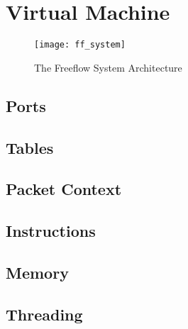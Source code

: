 \chapter{Virtual Machine}
\label{vm}

\begin{figure}[h]
\centering
\texttt{[image: ff\_system]}
\caption{The Freeflow System Architecture}
\label{fig:ff_system}
\end{figure}


\section{Ports}
\label{vm:port}

\section{Tables}
\label{vm:tables}

\section{Packet Context}
\label{vm:context}

\section{Instructions}
\label{vm:insn}

\section{Memory}
\label{vm:memory}

\section{Threading}
\label{vm:threading}
